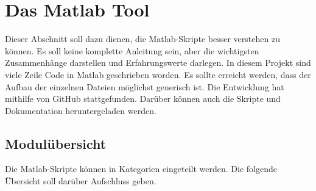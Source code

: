 \newpage
\section{Das Matlab Tool}

Dieser Abschnitt soll dazu dienen, die Matlab-Skripte besser verstehen zu können. Es soll keine komplette Anleitung sein, aber die wichtigsten Zusammenhänge darstellen und Erfahrungswerte darlegen. In diesem Projekt sind viele Zeile Code in Matlab geschrieben worden. Es sollte erreicht werden, dass der Aufbau der einzelnen Dateien möglichst generisch ist. Die Entwicklung hat mithilfe von GitHub stattgefunden. Darüber können auch die Skripte und Dokumentation heruntergeladen werden.


\subsection{Modulübersicht}
Die Matlab-Skripte können in Kategorien eingeteilt werden. Die folgende Übersicht soll darüber Aufschluss geben. 


